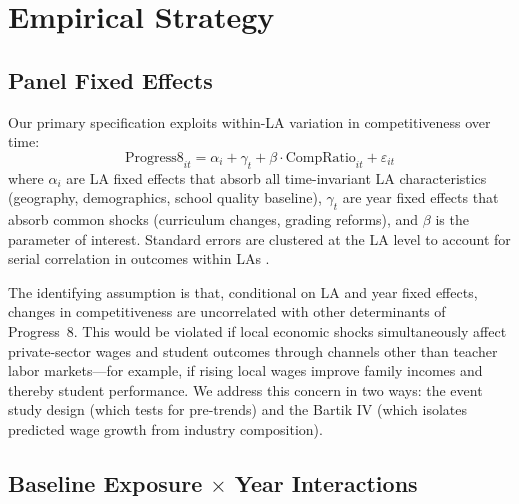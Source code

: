 \documentclass[12pt]{article}
\begin{document}
\section{Empirical Strategy}

\subsection{Panel Fixed Effects}

Our primary specification exploits within-LA variation in competitiveness over time:
\begin{equation}
\label{eq:main}
\text{Progress8}_{it} = \alpha_i + \gamma_t + \beta \cdot \text{CompRatio}_{it} + \varepsilon_{it}
\end{equation}
where $\alpha_i$ are LA fixed effects that absorb all time-invariant LA characteristics (geography, demographics, school quality baseline), $\gamma_t$ are year fixed effects that absorb common shocks (curriculum changes, grading reforms), and $\beta$ is the parameter of interest. Standard errors are clustered at the LA level to account for serial correlation in outcomes within LAs \citep{angrist2010inputs}.

The identifying assumption is that, conditional on LA and year fixed effects, changes in competitiveness are uncorrelated with other determinants of Progress~8. This would be violated if local economic shocks simultaneously affect private-sector wages and student outcomes through channels other than teacher labor markets---for example, if rising local wages improve family incomes and thereby student performance. We address this concern in two ways: the event study design (which tests for pre-trends) and the Bartik IV (which isolates predicted wage growth from industry composition).

\subsection{Baseline Exposure $\times$ Year Interactions}
\end{document}

